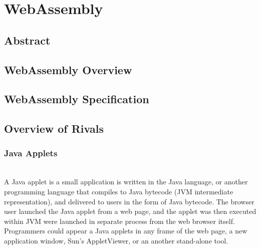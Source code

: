 \chapter{WebAssembly}

\section{Abstract}
\subsection{}
\subsection{}

\section{WebAssembly Overview}
\subsection{}
\subsection{}

\section{WebAssembly Specification}
\subsection{}
\subsection{}

\section{Overview of Rivals}
\subsection{Java Applets} \mbox{}\\
\indent A Java applet is a small application is written in the Java language, or another programming language that compiles to Java bytecode (JVM intermediate representation), and delivered to users in the form of Java bytecode. 
The browser user launched the Java applet from a web page, and the applet was then executed within JVM were launched in separate process from the web browser itself. 
Programmers could appear a Java applets in any frame of the web page, a new application window, Sun's AppletViewer, or an another stand-alone tool.

